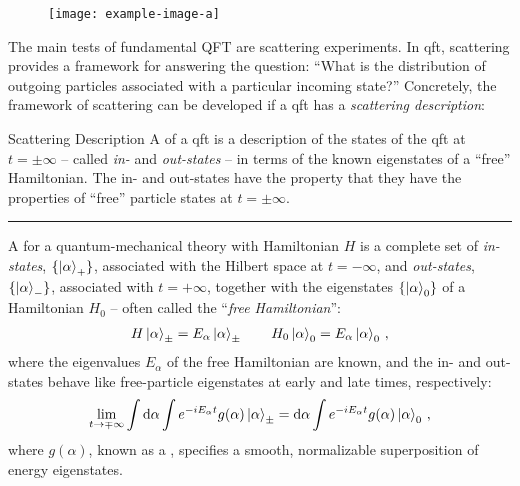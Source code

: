\begin{figure}[t!]
    \centering
    \texttt{[image: example-image-a]}

    \caption[]{
    }

    \label{fig:cross_section}
\end{figure}


The main tests of fundamental QFT are scattering experiments.
%
In \gls{qft}, scattering provides a framework for answering the question:
%
``What is the distribution of outgoing particles associated with a particular incoming state?''
%
Concretely, the framework of scattering can be developed if a \gls{qft} has a \textit{scattering description}:

\begin{definitionbox}{Scattering Description}{}
    A \emph{} of a \gls{qft} is a description of the states of the \gls{qft} at \(t = \pm \infty\) -- called \textit{in-} and \textit{out-states} -- in terms of the known eigenstates of a ``free'' Hamiltonian.
    The in- and out-states have the property that they have the properties of ``free'' particle states at \(t = \pm\infty\).

    \vspace{7pt}
    \hrule
    \vspace{7pt}

    A  for a quantum-mechanical theory with Hamiltonian \(H\) is a complete set of \textit{in-states}, \(\{\ket{\alpha}_+\}\), associated with the Hilbert space at \(t = -\infty\), and \textit{out-states}, \(\{\ket{\alpha}_-\}\), associated with \(t = +\infty\), together with the eigenstates \(\{\ket{\alpha}_0\}\) of a Hamiltonian \(H_0\) -- often called the ``\textit{free Hamiltonian}'':
    \begin{align}
        H \ket{\alpha}_\pm = E_\alpha \ket{\alpha}_\pm
        \qquad
        H_0 \ket{\alpha}_0 = E_\alpha \ket{\alpha}_0
        \,,
    \end{align}
    where the eigenvalues \(E_\alpha\) of the free Hamiltonian are known, and the in- and out-states behave like free-particle eigenstates at early and late times, respectively:
    \begin{align}
        \label{eq:scattering-states}
        \lim_{t \to \mp\infty}
        \int \dd \alpha \int e^{-i E_\alpha t}
        g(\alpha) \ket{\alpha}_\pm
        =
        \dd \alpha \int e^{-i E_\alpha t}
        g(\alpha) \ket{\alpha}_0
        \,,
    \end{align}
    where \(g(\alpha)\), known as a , specifies a smooth, normalizable superposition of energy eigenstates.
\end{definitionbox}

